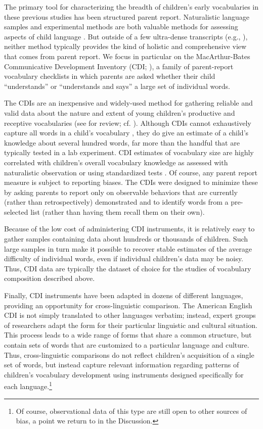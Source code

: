 \documentclass[manuscript]{stjour}
\begin{document}
The primary tool for characterizing the breadth of children's early
vocabularies in these previous studies has been structured parent
report. Naturalistic language samples and experimental methods are both
valuable methods for assessing aspects of child language
\citep{bornstein1998,fernald2006}. But outside of a few ultra-dense
transcripts (e.g., \citealp{roy2015}), neither method typically provides
the kind of holistic and comprehensive view that comes from parent
report. We focus in particular on the MacArthur-Bates Communicative
Development Inventory (CDI; \citealp{fenson2007}), a family of
parent-report vocabulary checklists in which parents are asked whether
their child ``understands'' or ``understands and says'' a large set of
individual words.

The CDIs are an inexpensive and widely-used method for gathering
reliable and valid data about the nature and extent of young children's
productive and receptive vocabularies (see \citealp{fenson1994} for
review; cf. \citealp{feldman2000, fenson2000}). Although CDIs cannot
exhaustively capture all words in a child's vocabulary
\citep{mayor2011}, they do give an estimate of a child's knowledge about
several hundred words, far more than the handful that are typically
tested in a lab experiment. CDI estimates of vocabulary size are highly
correlated with children's overall vocabulary knowledge as assessed with
naturalistic observation or using standardized tests \citep{fenson2007}.
Of course, any parent report measure is subject to reporting biases. The
CDIs were designed to minimize these by asking parents to report only on
observable behaviors that are currently (rather than retrospectively)
demonstrated and to identify words from a pre-selected list (rather than
having them recall them on their own).

Because of the low cost of administering CDI instruments, it is
relatively easy to gather samples containing data about hundreds or
thousands of children. Such large samples in turn make it possible to
recover stable estimates of the average difficulty of individual words,
even if individual children's data may be noisy. Thus, CDI data are
typically the dataset of choice for the studies of vocabulary
composition described above.

Finally, CDI instruments have been adapted in dozens of different
languages, providing an opportunity for cross-linguistic comparison. The
American English CDI is not simply translated to other languages
verbatim; instead, expert groups of researchers adapt the form for their
particular linguistic and cultural situation. This process leads to a
wide range of forms that share a common structure, but contain sets of
words that are customized to a particular language and culture. Thus,
cross-linguistic comparisons do not reflect children's acquisition of a
single set of words, but instead capture relevant information regarding
patterns of children's vocabulary development using instruments designed
specifically for each language.\footnote{Of course, observational data
  of this type are still open to other sources of bias, a point we
  return to in the Discussion.}
\end{document}
